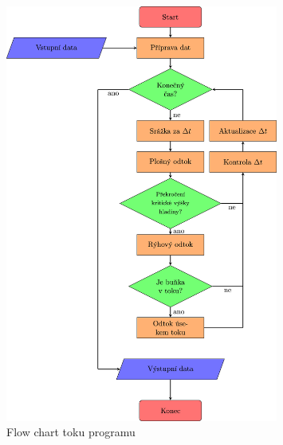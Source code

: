 \begin{figure}[t!]
  \centering
  \includegraphics[width=0.8\textwidth]{./img/CZflowch.png}
  \caption{Flow chart toku programu}
  \label{fig:flowchart}
\end{figure}
